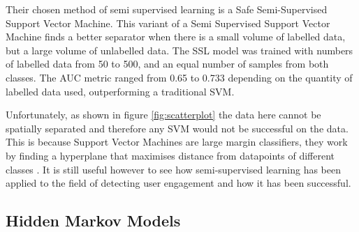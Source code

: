 \documentclass{article}
\begin{document}
Their chosen method of semi supervised learning is a Safe Semi-Supervised Support Vector Machine.
This variant of a Semi Supervised Support Vector Machine finds a better separator when there is a small volume of labelled data, but a large volume of unlabelled data.
The SSL model was trained with numbers of labelled data from 50 to 500, and an equal number of samples from both classes.
The AUC metric ranged from 0.65 to 0.733 depending on the quantity of labelled data used, outperforming a traditional SVM.

Unfortunately, as shown in figure \ref{fig:scatterplot} the data here cannot be spatially separated and therefore any SVM would not be successful on the data.
This is because Support Vector Machines are large margin classifiers, they work by finding a hyperplane that maximises distance from datapoints of different classes \cite{campbell2000query}. 
It is still useful however to see how semi-supervised learning has been applied to the field of detecting user engagement and how it has been successful.

%   

\subsection{Hidden Markov Models}





\end{document}
